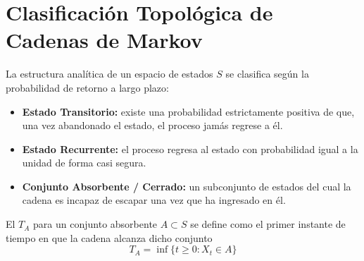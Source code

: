 \section{Clasificación Topológica de Cadenas de Markov}
La estructura analítica de un espacio de estados $S$ se clasifica según la probabilidad de retorno a largo plazo:
\begin{itemize}
    \item \textbf{Estado Transitorio:} existe una probabilidad estrictamente positiva de que, una vez abandonado el estado, el proceso jamás regrese a él.
    \item \textbf{Estado Recurrente:} el proceso regresa al estado con probabilidad igual a la unidad de forma casi segura.
    \item \textbf{Conjunto Absorbente / Cerrado:} un subconjunto de estados del cual la cadena es incapaz de escapar una vez que ha ingresado en él.
\end{itemize}
\begin{definicion}
    El  $T_A$ para un conjunto absorbente $A \subset S$ se define como el primer instante de tiempo en que la cadena alcanza dicho conjunto
    \[
    T_A = \inf\{t \ge 0 : X_t \in A\}
    \]
\end{definicion}

